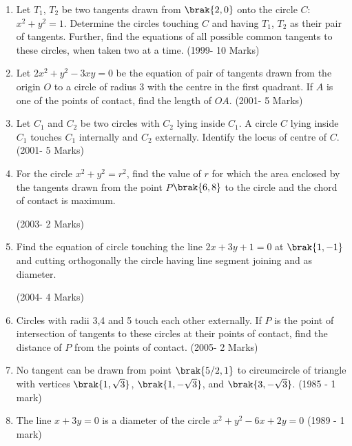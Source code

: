 \begin{enumerate}
\item Let $T_{1}$, $T_{2}$ be two tangents drawn from $\brak{2,0}$ onto the circle $C$:$x^2+y^2=1$. Determine the circles touching $C$ and having $T_{1}$, $T_{2}$ as their pair of tangents. Further, find the equations of all possible common tangents to these circles, when taken two at a time.
                  \hfill(1999- 10 Marks)\\




\item Let $2x^2+y^2-3xy=0$ be the equation of pair of tangents drawn from the origin $O$ to a circle of radius 3 with the centre in the first quadrant. If $A$ is one of the points of contact, find the length of $OA$.                   \hfill(2001- 5 Marks)\\




\item Let $C_{1}$ and $C_{2}$ be two circles with $C_{2}$ lying inside $C_{1}$. A circle $C$ lying inside $C_{1}$ touches $C_{1}$ internally and $C_{2}$ externally. Identify the locus of centre of $C$.                                \hfill(2001- 5 Marks)\\



\item For the circle $x^2+y^2=r^2$, find the value of $r$ for which the area enclosed by the tangents drawn from the point $P$$\brak{6,8}$ to the circle and the chord of contact is maximum.


\hfill(2003- 2 Marks)\\ 





\item Find the equation of circle touching the line $2x+3y+1=0$ at $\brak{1,-1}$ and cutting orthogonally the circle having line segment joining  and  as diameter.


\hfill(2004- 4 Marks)\\     




\item Circles with radii 3,4 and 5 touch each other externally. If $P$ is the point of intersection of tangents to these circles at their points of contact, find the distance of $P$ from the points of contact.
	           \hfill(2005- 2 Marks)\\ 
    \item No tangent can be drawn from point $\brak{5/2, 1}$ to circumcircle of triangle with vertices $\brak{1, \sqrt{3}}$, $\brak{1, -\sqrt{3}}$, and $\brak{3, -\sqrt{3}}$.
    \hfill{(1985 - 1 mark)}
    \item The line $x+3y = 0$ is a diameter of the circle $ x^{2} + y^{2} - 6x +2y = 0$
    \hfill{(1989 - 1 mark)}


\end{enumerate}
